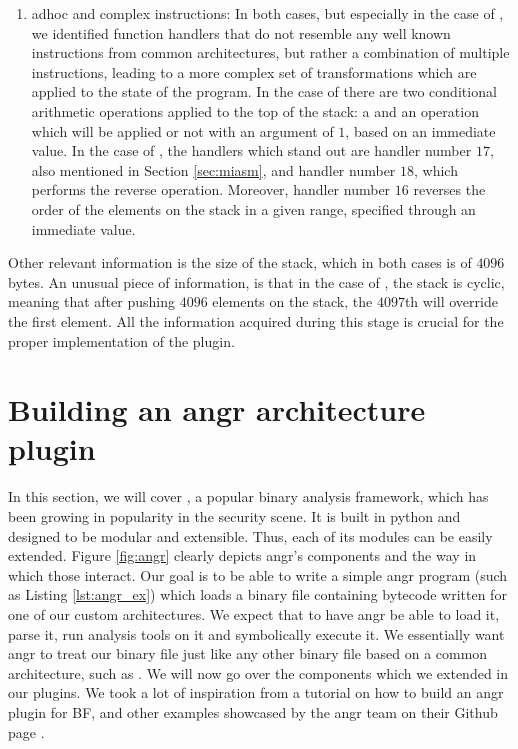 \begin{enumerate}
    \item adhoc and complex instructions: In both cases, but especially in the case of , we identified function handlers that do not resemble any well known instructions from common architectures, but rather a combination of multiple instructions, leading to a more complex set of transformations which are applied to the state of the program. In the case of  there are two conditional arithmetic operations applied to the top of the stack: a  and an  operation which will be applied or not with an argument of $1$, based on an immediate value. In the case of , the handlers which stand out are handler number $17$, also mentioned in Section \ref{sec:miasm}, and handler number $18$, which performs the reverse operation. Moreover, handler number $16$ reverses the order of the elements on the stack in a given range, specified through an immediate value.
\end{enumerate} 

Other relevant information is the size of the stack, which in both cases is of $4096$ bytes. An unusual piece of information, is that in the case of , the stack is cyclic, meaning that after pushing $4096$ elements on the stack, the $4097$th will override the first element. All the information acquired during this stage is crucial for the proper implementation of the  plugin.

\section{Building an angr architecture plugin}

In this section, we will cover  \cite{angr}, a popular binary analysis framework, which has been growing in popularity in the security scene. It is built in python and designed to be modular and extensible. Thus, each of its modules can be easily extended. Figure \ref{fig:angr} clearly depicts angr's components and the way in which those interact. Our goal is to be able to write a simple angr program (such as Listing \ref{lst:angr_ex}) which loads a binary file containing bytecode written for one of our custom architectures. We expect that to have angr be able to load it, parse it, run analysis tools on it and symbolically execute it. We essentially want angr to treat our binary file just like any other binary file based on a common architecture, such as . We will now go over the components which we extended in our plugins. We took a lot of inspiration from a tutorial on how to build an angr plugin for \gls{BF}, and other examples showcased by the angr team on their Github page \cite{angr_tut}.

